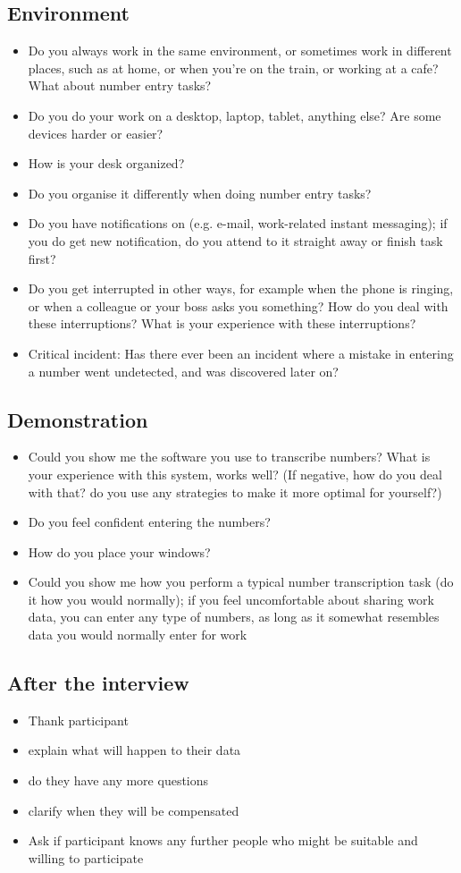 \subsection{Environment}
\begin{itemize}
\item Do you always work in the same environment, or sometimes work in different places, such as at home, or when you're on the train, or working at a cafe? What about number entry tasks?
\item Do you do your work on a desktop, laptop, tablet, anything else? Are some devices harder or easier?
\item How is your desk organized?
\item Do you organise it differently when doing number entry tasks?
\item Do you have notifications on (e.g. e-mail, work-related instant messaging); if you do get new notification, do you attend to it straight away or finish task first?
\item Do you get interrupted in other ways, for example when the phone is ringing, or when a colleague or your boss asks you something? How do you deal with these interruptions? What is your experience with these interruptions?
\item Critical incident: Has there ever been an incident where a mistake in entering a number went undetected, and was discovered later on?
\end{itemize}

\subsection{Demonstration}
\begin{itemize}
\item Could you show me the software you use to transcribe numbers?
What is your experience with this system, works well?
(If negative, how do you deal with that? do you use any strategies to make it more optimal for yourself?)
\item Do you feel confident entering the numbers?
\item How do you place your windows?
\item Could you show me how you perform a typical number transcription task (do it how you would normally); if you feel uncomfortable about sharing work data, you can enter any type of numbers, as long as it somewhat resembles data you would normally enter for work
\end{itemize}
\subsection{After the interview}
\begin{itemize}
\item Thank participant
\item explain what will happen to their data
\item do they have any more questions
\item clarify when they will be compensated
\item Ask if participant knows any further people who might be suitable and willing to participate
\end{itemize}


